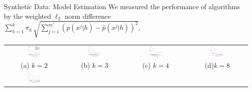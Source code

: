 \documentclass[final,t]{beamer}
\begin{document}
\begin{frame}{}
\begin{columns}[T]
\begin{column}{0.3\linewidth}
    \begin{block}{Synthetic Data: Model Estimation}
      \vspace{0.1in}
      We measured the performance of algorithms by the weighted $\ell_2$ norm difference
      $
      \sum_{h=1}^{k} \pi_h\, \sqrt{\sum_{j=1}^{m'} (p(x^j|h) - \widehat{p}(x^j|h))^2 },
      $
      \begin{table}
        \begin{tabular}{cccc}
          \includegraphics[width=0.23\textwidth]{../experiment/figure_new/sp_diff_gauss_k_2_view_2-crop} &
          \includegraphics[width=0.23\textwidth]{../experiment/figure_new/sp_diff_gauss_k_3_view_3-crop} &
          \includegraphics[width=0.23\textwidth]{../experiment/figure_new/sp_diff_gauss_k_4_view_1-crop} &
          \includegraphics[width=0.23\textwidth]{../experiment/figure_new/sp_diff_gauss_k_8_view_1-crop} \\[-1mm]
          (a) $k=2$ & (b) $k=3$ & (c) $k=4$ & (d)$k=8$ \\[-1mm]
          \includegraphics[width=0.23\textwidth]{../experiment/figure_new/sp_diff_heter_k_2_view_2-crop} &

\end{tabular}
\end{table}
\end{block}
\end{column}
\end{columns}
\end{frame}
\end{document}
